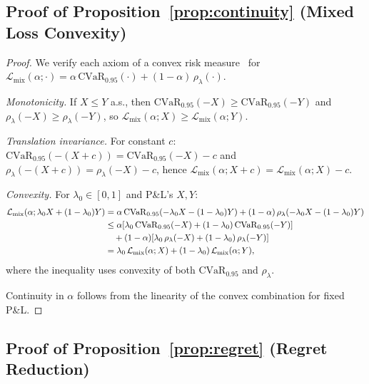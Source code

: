 \documentclass[11pt]{article}
\newcommand{\cvar}{\mathrm{CVaR}}
\begin{document}
\subsection{Proof of Proposition~\ref{prop:continuity} (Mixed Loss Convexity)}

\begin{proof}
We verify each axiom of a convex risk measure~\citep{follmer2002convex} for $\mathcal{L}_{\mathrm{mix}}(\alpha;\cdot) = \alpha\,\cvar_{0.95}(\cdot) + (1-\alpha)\,\rho_\lambda(\cdot)$.

\textit{Monotonicity.} If $X \le Y$ a.s., then $\cvar_{0.95}(-X) \ge \cvar_{0.95}(-Y)$ and $\rho_\lambda(-X) \ge \rho_\lambda(-Y)$, so $\mathcal{L}_{\mathrm{mix}}(\alpha;X) \ge \mathcal{L}_{\mathrm{mix}}(\alpha;Y)$.

\textit{Translation invariance.} For constant $c$: $\cvar_{0.95}(-(X+c)) = \cvar_{0.95}(-X) - c$ and $\rho_\lambda(-(X+c)) = \rho_\lambda(-X) - c$, hence $\mathcal{L}_{\mathrm{mix}}(\alpha;X+c) = \mathcal{L}_{\mathrm{mix}}(\alpha;X) - c$.

\textit{Convexity.} For $\lambda_0 \in [0,1]$ and P\&L's $X,Y$:
\begin{align}
    \mathcal{L}_{\mathrm{mix}}(\alpha;\lambda_0 X + (1-\lambda_0)Y)
    &= \alpha\,\cvar_{0.95}(-\lambda_0 X - (1-\lambda_0)Y) + (1-\alpha)\,\rho_\lambda(-\lambda_0 X - (1-\lambda_0)Y) \notag\\
    &\le \alpha[\lambda_0\,\cvar_{0.95}(-X) + (1-\lambda_0)\,\cvar_{0.95}(-Y)] \notag\\
    &\quad + (1-\alpha)[\lambda_0\,\rho_\lambda(-X) + (1-\lambda_0)\,\rho_\lambda(-Y)] \notag\\
    &= \lambda_0\,\mathcal{L}_{\mathrm{mix}}(\alpha;X) + (1-\lambda_0)\,\mathcal{L}_{\mathrm{mix}}(\alpha;Y),
\end{align}
where the inequality uses convexity of both $\cvar_{0.95}$ and $\rho_\lambda$.

Continuity in $\alpha$ follows from the linearity of the convex combination for fixed P\&L.
\end{proof}

\subsection{Proof of Proposition~\ref{prop:regret} (Regret Reduction)}
\end{document}
